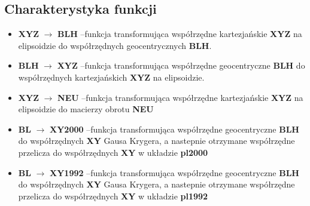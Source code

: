 \documentclass[a4paper,titleauthor]{mwart}
\begin{document}
    \subsection{Charakterystyka funkcji}
    \begin{itemize}
        \item \textbf{XYZ} $\rightarrow$ \textbf{BLH} --funkcja transformująca współrzędne kartezjańskie \textbf{XYZ} na elipsoidzie do współrzędnych geocentrycznych \textbf{BLH}.
        \begin{flushright}
            \cite{ewmapa}
        \end{flushright}
        \item \textbf{BLH} $\rightarrow$ \textbf{XYZ} --funkcja transformująca współrzędne geocentryczne \textbf{BLH} do współrzędnych kartezjańskich \textbf{XYZ} na elipsoidzie.  
        \begin{flushright}
            \cite{ewmapa}
        \end{flushright}
        \item \textbf{XYZ} $\rightarrow$ \textbf{NEU} --funkcja transformująca współrzędne kartezjańskie \textbf{XYZ} na elipsoidzie do macierzy obrotu \textbf{NEU}
        \begin{flushright}
            \cite{ASGEUPOS2021}
        \end{flushright}
        \item \textbf{BL} $\rightarrow$ \textbf{XY2000} --funkcja transformująca współrzędne geocentryczne \textbf{BLH} do współrzędnych \textbf{XY} Gausa Krygera, a nastepnie otrzymane współrzędne przelicza do współrzędnych \textbf{XY} w układzie \textbf{pl2000}
        \begin{flushright}
            \cite{ASGEUPOS2021}
        \end{flushright}
        \item \textbf{BL} $\rightarrow$ \textbf{XY1992} --funkcja transformująca współrzędne geocentryczne \textbf{BLH} do współrzędnych \textbf{XY} Gausa Krygera, a nastepnie otrzymane współrzędne przelicza do współrzędnych \textbf{XY} w układzie \textbf{pl1992}
        \begin{flushright}
            \cite{ASGEUPOS2021}
        \end{flushright}
    \end{itemize}
\end{document}
